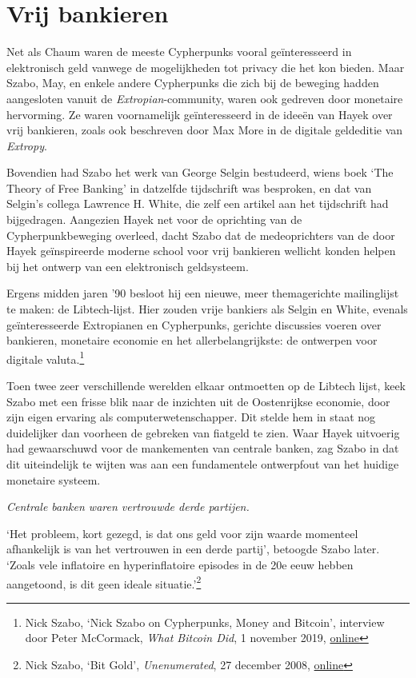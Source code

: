 \documentclass[
  a5paper,
  smalldemyvopaper,11pt,twoside,onecolumn,openright,extrafontsizes]{memoir}
\begin{document}
\section{Vrij bankieren}\label{vrij-bankieren}

Net als Chaum waren de meeste Cypherpunks vooral geïnteresseerd in
elektronisch geld vanwege de mogelijkheden tot privacy die het kon
bieden. Maar Szabo, May, en enkele andere Cypherpunks die zich bij de
beweging hadden aangesloten vanuit de \emph{Extropian}-community, waren
ook gedreven door monetaire hervorming. Ze waren voornamelijk
geïnteresseerd in de ideeën van Hayek over vrij bankieren, zoals ook
beschreven door Max More in de digitale geldeditie van \emph{Extropy}.

Bovendien had Szabo het werk van George Selgin bestudeerd, wiens boek
`The Theory of Free Banking' in datzelfde tijdschrift was besproken, en
dat van Selgin's collega Lawrence H. White, die zelf een artikel aan het
tijdschrift had bijgedragen. Aangezien Hayek net voor de oprichting van
de Cypherpunkbeweging overleed, dacht Szabo dat de medeoprichters van de
door Hayek geïnspireerde moderne school voor vrij bankieren wellicht
konden helpen bij het ontwerp van een elektronisch geldsysteem.

Ergens midden jaren '90 besloot hij een nieuwe, meer themagerichte
mailinglijst te maken: de Libtech-lijst. Hier zouden vrije bankiers als
Selgin en White, evenals geïnteresseerde Extropianen en Cypherpunks,
gerichte discussies voeren over bankieren, monetaire economie en het
allerbelangrijkste: de ontwerpen voor digitale valuta.\footnote{Nick
  Szabo, `Nick Szabo on Cypherpunks, Money and Bitcoin', interview door
  Peter McCormack, \emph{What Bitcoin Did}, 1 november 2019,
  \href{https://www.whatbitcoindid.com/podcast/nick-szabo-on-cypherpunks-money-and-bitcoin}{online}}

Toen twee zeer verschillende werelden elkaar ontmoetten op de Libtech
lijst, keek Szabo met een frisse blik naar de inzichten uit de
Oostenrijkse economie, door zijn eigen ervaring als
computerwetenschapper. Dit stelde hem in staat nog duidelijker dan
voorheen de gebreken van fiatgeld te zien. Waar Hayek uitvoerig had
gewaarschuwd voor de mankementen van centrale banken, zag Szabo in dat
dit uiteindelijk te wijten was aan een fundamentele ontwerpfout van het
huidige monetaire systeem.

\emph{Centrale banken waren vertrouwde derde partijen.}

`Het probleem, kort gezegd, is dat ons geld voor zijn waarde momenteel
afhankelijk is van het vertrouwen in een derde partij', betoogde Szabo
later. `Zoals vele inflatoire en hyperinflatoire episodes in de 20e eeuw
hebben aangetoond, is dit geen ideale situatie.'\footnote{Nick Szabo,
  `Bit Gold', \emph{Unenumerated}, 27 december 2008,
  \href{https://unenumerated.blogspot.com/2005/12/bit-gold.html}{online}}
\end{document}
